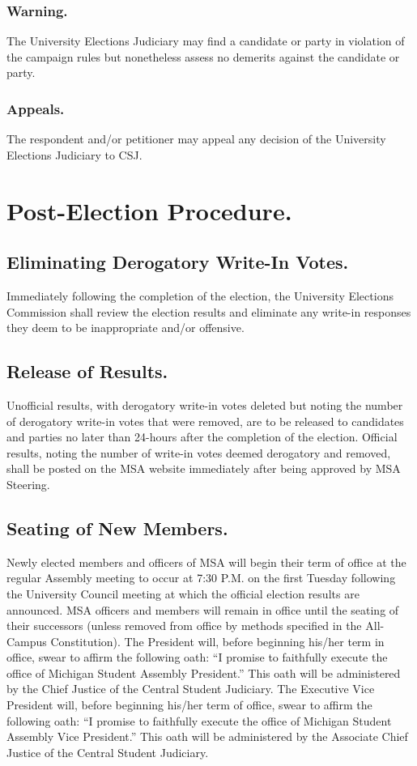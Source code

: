 \subsubsection{Warning.}
The University Elections Judiciary may find a candidate or party in violation of the campaign rules but nonetheless assess no demerits against the candidate or party.

\subsubsection{Appeals.}
The respondent and/or petitioner may appeal any decision of the University Elections Judiciary to CSJ.  


\section{Post-Election Procedure.}
\subsection{Eliminating Derogatory Write-In Votes.}
Immediately following the completion of the election, the University Elections Commission shall review the election results and eliminate any write-in responses they deem to be inappropriate and/or offensive.
\subsection{Release of Results.}
Unofficial results, with derogatory write-in votes deleted but noting the number of derogatory write-in votes that were removed, are to be released to candidates and parties no later than 24-hours after the completion of the election. Official results, noting the number of write-in votes deemed derogatory and removed, shall be posted on the MSA website immediately after being approved by MSA Steering.
\subsection{Seating of New Members.}
Newly elected members and officers of MSA will begin their term of office at the regular Assembly meeting to occur at 7:30 P.M. on the first Tuesday following the University Council meeting at which the official election results are announced.  MSA officers and members will remain in office until the seating of their successors (unless removed from office by methods specified in the All-Campus Constitution).  The President will, before beginning his/her term in office, swear to affirm the following oath: ``I promise to faithfully execute the office of Michigan Student Assembly President.''  This oath will be administered by the Chief Justice of the Central Student Judiciary.  The Executive Vice President will, before beginning his/her term of office, swear to affirm the following oath: ``I promise to faithfully execute the office of Michigan Student Assembly Vice President.''  This oath will be administered by the Associate Chief Justice of the Central Student Judiciary.
